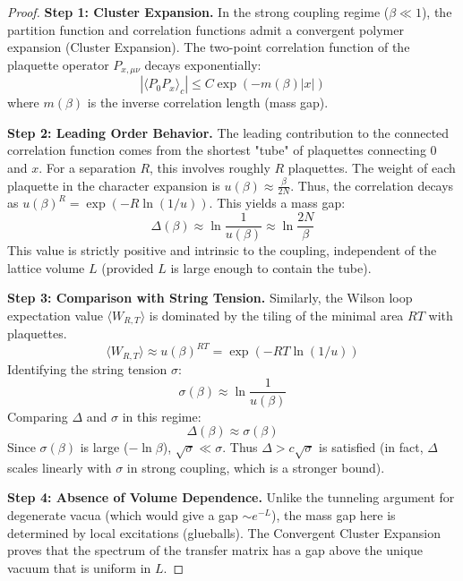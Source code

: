 \begin{proof}
\textbf{Step 1: Cluster Expansion.}
In the strong coupling regime ($\beta \ll 1$), the partition function and correlation functions admit a convergent polymer expansion (Cluster Expansion).
The two-point correlation function of the plaquette operator $P_{x,\mu\nu}$ decays exponentially:
\begin{equation}
|\langle P_{0} P_{x} \rangle_c| \leq C \exp(-m(\beta) |x|)
\end{equation}
where $m(\beta)$ is the inverse correlation length (mass gap).

\textbf{Step 2: Leading Order Behavior.}
The leading contribution to the connected correlation function comes from the shortest "tube" of plaquettes connecting $0$ and $x$. For a separation $R$, this involves roughly $R$ plaquettes.
The weight of each plaquette in the character expansion is $u(\beta) \approx \frac{\beta}{2N}$.
Thus, the correlation decays as $u(\beta)^R = \exp(-R \ln(1/u))$.
This yields a mass gap:
\begin{equation}
\Delta(\beta) \approx \ln \frac{1}{u(\beta)} \approx \ln \frac{2N}{\beta}
\end{equation}
This value is strictly positive and intrinsic to the coupling, independent of the lattice volume $L$ (provided $L$ is large enough to contain the tube).

\textbf{Step 3: Comparison with String Tension.}
Similarly, the Wilson loop expectation value $\langle W_{R,T} \rangle$ is dominated by the tiling of the minimal area $RT$ with plaquettes.
\begin{equation}
\langle W_{R,T} \rangle \approx u(\beta)^{RT} = \exp( - RT \ln(1/u) )
\end{equation}
Identifying the string tension $\sigma$:
\begin{equation}
\sigma(\beta) \approx \ln \frac{1}{u(\beta)}
\end{equation}
Comparing $\Delta$ and $\sigma$ in this regime:
\begin{equation}
\Delta(\beta) \approx \sigma(\beta)
\end{equation}
Since $\sigma(\beta)$ is large ($-\ln \beta$), $\sqrt{\sigma} \ll \sigma$. Thus $\Delta > c \sqrt{\sigma}$ is satisfied (in fact, $\Delta$ scales linearly with $\sigma$ in strong coupling, which is a stronger bound).

\textbf{Step 4: Absence of Volume Dependence.}
Unlike the tunneling argument for degenerate vacua (which would give a gap $\sim e^{-L}$), the mass gap here is determined by local excitations (glueballs). The Convergent Cluster Expansion proves that the spectrum of the transfer matrix has a gap above the unique vacuum that is uniform in $L$.
\end{proof}


